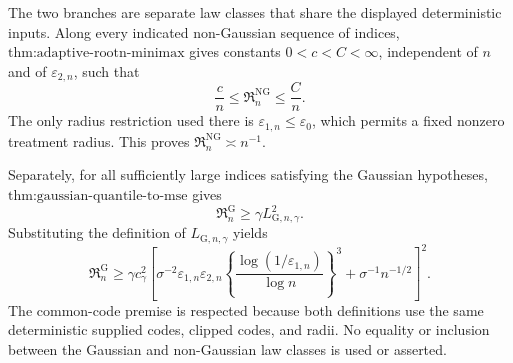 The two branches are separate law classes that share the displayed
deterministic inputs.  Along every indicated non-Gaussian sequence of
indices, \(\text{thm:adaptive-rootn-minimax}\) gives constants
\(0<c<C<\infty\), independent of \(n\) and of
\(\varepsilon_{2,n}\), such that
\[
 \frac cn\le\mathfrak R_n^{\mathrm{NG}}\le\frac Cn.
\]
The only radius restriction used there is
\(\varepsilon_{1,n}\le\varepsilon_0\), which permits a fixed nonzero
treatment radius.  This proves
\(\mathfrak R_n^{\mathrm{NG}}\asymp n^{-1}\).

Separately, for all sufficiently large indices satisfying the Gaussian
hypotheses, \(\text{thm:gaussian-quantile-to-mse}\) gives
\[
 \mathfrak R_n^{\mathrm G}\ge\gamma L_{\mathrm G,n,\gamma}^2.
\]
Substituting the definition of \(L_{\mathrm G,n,\gamma}\) yields
\[
 \mathfrak R_n^{\mathrm G}\ge
 \gamma c_{\gamma}^2\left[
 \sigma^{-2}\varepsilon_{1,n}\varepsilon_{2,n}
 \left\{\frac{\log(1/\varepsilon_{1,n})}{\log n}\right\}^{3}
 +\sigma^{-1}n^{-1/2}\right]^2.
\]
The common-code premise is respected because both definitions use the
same deterministic supplied codes, clipped codes, and radii.  No equality
or inclusion between the Gaussian and non-Gaussian law classes is used or
asserted.